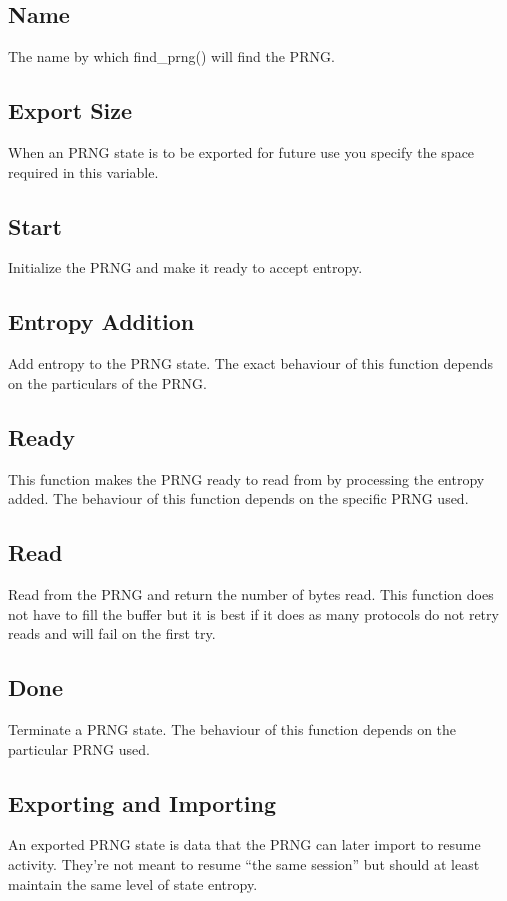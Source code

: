 \documentclass[a4paper]{book}
\begin{document}
\subsection{Name}
The name by which find\_prng() will find the PRNG.

\subsection{Export Size}
When an PRNG state is to be exported for future use you specify the space required in this variable.

\subsection{Start}
Initialize the PRNG and make it ready to accept entropy.

\subsection{Entropy Addition}
Add entropy to the PRNG state.  The exact behaviour of this function depends on the particulars of the PRNG.

\subsection{Ready}
This function makes the PRNG ready to read from by processing the entropy added.  The behaviour of this function depends
on the specific PRNG used.

\subsection{Read}
Read from the PRNG and return the number of bytes read.  This function does not have to fill the buffer but it is best 
if it does as many protocols do not retry reads and will fail on the first try.

\subsection{Done}
Terminate a PRNG state.  The behaviour of this function depends on the particular PRNG used.

\subsection{Exporting and Importing}
An exported PRNG state is data that the PRNG can later import to resume activity.  They're not meant to resume ``the same session''
but should at least maintain the same level of state entropy.


\end{document}
